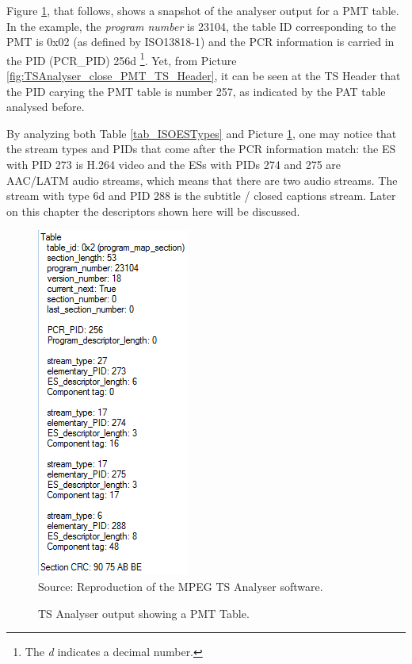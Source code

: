 \documentclass[
	12pt,				%
	openright,			%
	twoside,			%
	a4paper,			%
	brazil,
	french,				%
	english
	]{abntex2}
\begin{document}
Figure \ref{fig:TSAnalyser_close_PMT}, that follows, shows a snapshot of the analyser output for a PMT table. In the example, the \textit{program number} is 23104, the table ID corresponding to the PMT is 0x02 (as defined by ISO13818-1) and the PCR information is carried in the PID (PCR\_PID) 256d \footnote{The \textit{d} indicates a decimal number.}. Yet, from Picture \ref{fig:TSAnalyser_close_PMT_TS_Header}, it can be seen at the TS Header that the PID carying the PMT table is number 257, as indicated by the PAT table analysed before.

By analyzing both Table \ref{tab_ISOESTypes} and Picture \ref{fig:TSAnalyser_close_PMT}, one may notice that the stream types and PIDs that come after the PCR information match: the ES with PID 273 is H.264 video and the ESs with PIDs 274 and 275 are AAC/LATM audio streams, which means that there are two audio streams. The stream with type 6d and PID 288 is the subtitle / closed captions stream. Later on this chapter the descriptors shown here will be discussed.

\begin{figure}[!hb]
\centering
\caption{TS Analyser output showing a PMT Table.}
\includegraphics[width=0.4\linewidth]{figuras/TSAnalyser_close_PMT.png}
\\Source: Reproduction of the MPEG TS Analyser software.
\label{fig:TSAnalyser_close_PMT}
\end{figure}
\end{document}
